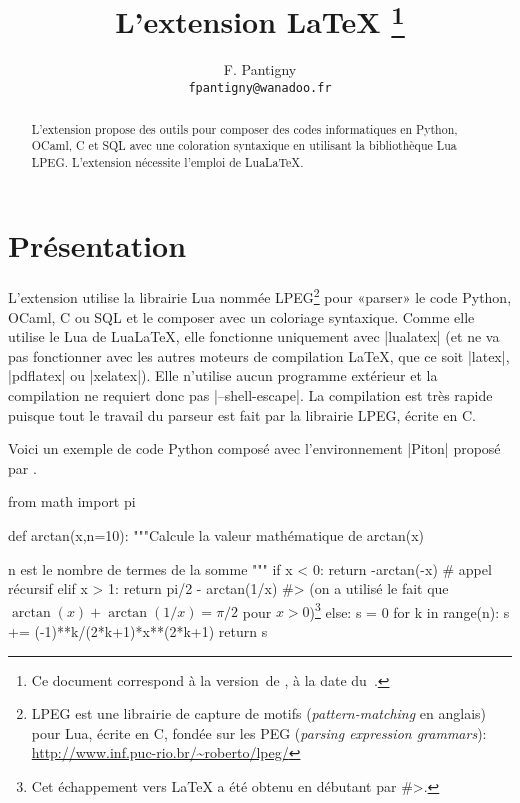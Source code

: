 \documentclass[dvipsnames,svgnames]{article}
\begin{document}
\VerbatimFootnotes


\title{L'extension LaTeX \thanks{Ce document correspond à la 
version~\PitonFileVersion\space de , à la date du~\PitonFileDate.}} 
\author{F. Pantigny \\ \texttt{fpantigny@wanadoo.fr}}

\maketitle

\begin{abstract}
L'extension  propose des outils pour composer des codes informatiques en Python, OCaml, C et SQL avec
une coloration syntaxique en utilisant la bibliothèque Lua LPEG. L'extension  nécessite l'emploi de
LuaLaTeX.
\end{abstract}



\section{Présentation}

L'extension  utilise la librairie Lua nommée LPEG\footnote{LPEG est une librairie de capture de motifs
  (\emph{pattern-matching} en anglais) pour Lua, écrite en C, fondée sur les PEG (\emph{parsing expression
    grammars}): \url{http://www.inf.puc-rio.br/~roberto/lpeg/}} pour «parser» le code Python, OCaml, C ou SQL et le
composer avec un coloriage syntaxique. Comme elle utilise le Lua de LuaLaTeX, elle fonctionne uniquement avec |lualatex|
(et ne va pas fonctionner avec les autres moteurs de compilation LaTeX, que ce soit |latex|, |pdflatex| ou
|xelatex|). Elle n'utilise aucun programme extérieur et la compilation ne requiert donc pas |--shell-escape|. La
compilation est très rapide puisque tout le travail du parseur est fait par la librairie LPEG, écrite en C.

\bigskip
Voici un exemple de code Python composé avec l'environnement |{Piton}| proposé par .


\bigskip
\begin{Piton}
from math import pi

def arctan(x,n=10):
    """Calcule la valeur mathématique de arctan(x)

    n est le nombre de termes de la somme
    """
    if x < 0:
        return -arctan(-x) # appel récursif
    elif x > 1: 
        return pi/2 - arctan(1/x) 
        #> (on a utilisé le fait que $\arctan(x)+\arctan(1/x)=\pi/2$ pour $x>0$)\footnote{Cet échappement vers LaTeX a été obtenu en débutant par \ttfamily\#>.} 
    else: 
        s = 0
        for k in range(n):
            s += (-1)**k/(2*k+1)*x**(2*k+1)
        return s 
\end{Piton}
\end{document}
